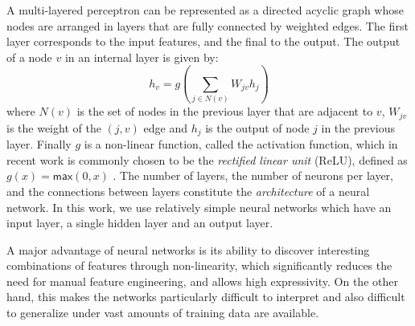 A multi-layered perceptron can be represented as a directed acyclic graph whose nodes are arranged in layers that are fully connected by weighted edges. The first layer corresponds to the input features, and the final to the output. The output of a node $v$ in an internal layer is given by:
\[ h_v = g(\sum_{j \in N(v)} W_{jv} h_j ) \]
where $N(v)$ is the set of nodes in the previous layer that are adjacent to $v$, $W_{jv}$ is the weight of the $(j, v)$ edge and $h_j$ is the output of node $j$ in the previous layer. Finally $g$ is a non-linear function, called the activation function, which in recent work is commonly chosen to be the \emph{rectified linear unit} (ReLU),
defined as $g(x) = \mathsf{max}(0,x)$ \citep{Nair2010-xg}. The number of layers, the number of neurons per layer, and the connections between layers constitute the \emph{architecture} of a neural network. In this work, we use relatively simple neural networks which have an input layer, a single hidden layer and an output layer. 

A major advantage of neural networks is its ability to discover interesting combinations of features through non-linearity, which significantly reduces the need for manual feature engineering, and allows high expressivity. On the other hand, this makes the networks particularly difficult to interpret and also difficult to generalize under vast amounts of training data are available. 

%
%
%
%
%

%
%
%

